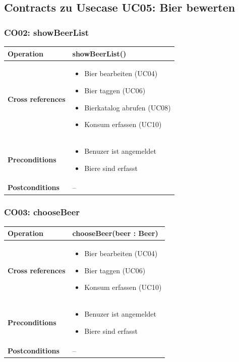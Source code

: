 \documentclass[10pt,a4paper]{scrartcl}
\begin{document}
\subsection{Contracts zu Usecase UC05: Bier bewerten}
\subsubsection{CO02: showBeerList}
\begin{tabular}{|l|p{}|}
\hline
 \textbf{Operation} & showBeerList() \\ 
\hline
\textbf{Cross references} & \begin{itemize}
								\item Bier bearbeiten (UC04)
								\item Bier taggen (UC06)
								\item Bierkatalog abrufen (UC08)
								\item Konsum erfassen (UC10)
							\end{itemize} \\ 
\hline 
\textbf{Preconditions} & \begin{itemize}
							\item Benuzer ist angemeldet
							\item Biere sind erfasst 
						 \end{itemize}\\
\hline 
\textbf{Postconditions} & -- \\
\hline
\end{tabular}

\subsubsection{CO03: chooseBeer}
\begin{tabular}{|l|p{}|}
\hline
 \textbf{Operation} & chooseBeer(beer : Beer) \\ 
\hline
\textbf{Cross references} & \begin{itemize}
								\item Bier bearbeiten (UC04)
								\item Bier taggen (UC06)
								\item Konsum erfassen (UC10)
						    \end{itemize} \\ 
\hline 
\textbf{Preconditions} & \begin{itemize}
							\item Benuzer ist angemeldet
							\item Biere sind erfasst 
						 \end{itemize} \\
\hline 
\textbf{Postconditions} & -- \\
\hline
\end{tabular}
\end{document}
